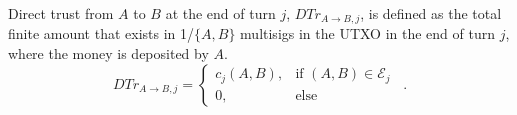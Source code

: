 {}
\begin{definition}
  Direct trust from $A$ to $B$ at the end of turn $j$, $DTr_{A \rightarrow B, j}$, is defined as the total finite amount that
  exists in 1/$\{A,B\}$ multisigs in the UTXO in the end of turn $j$, where the money is deposited by $A$.
  \begin{equation}
    DTr_{A \rightarrow B, j} =
      \begin{cases}
        c_j\left(A, B\right), & \mbox{if } \left(A, B\right) \in \mathcal{E}_j \\
        0, & \mbox{else}
      \end{cases} \enspace .
  \end{equation}
\end{definition}
